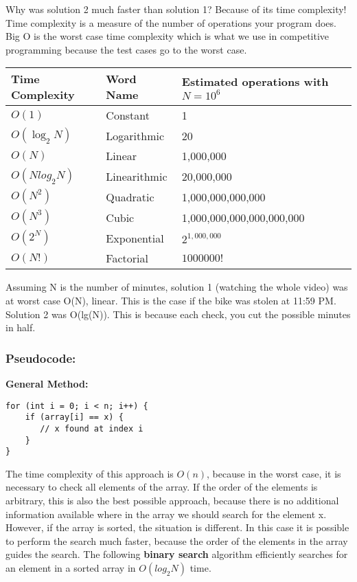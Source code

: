 \documentclass{report}
\begin{document}
Why was solution 2 much faster than solution 1? Because of its time complexity! Time complexity is a measure of the number of operations your program does. Big O is the worst case time complexity which is what we use in competitive programming because the test cases go to the worst case. 

\begin{table}[ht]
    \centering
    \begin{tabularx}{\linewidth}{|X|X|X|}
        \hline
        \cellcolor{gray!25} \textbf{Time Complexity} & \cellcolor{gray!25} \textbf{Word Name} & \cellcolor{gray!25} \textbf{Estimated operations with $N = 10^6$} \\
        \hline
        $O(1)$ & Constant & 1 \\
        \hline
        $O(\log_2N)$ & Logarithmic & 20 \\
        \hline
        $O(N)$ & Linear & 1,000,000 \\
        \hline
        $O(Nlog_2N)$ & Linearithmic & 20,000,000 \\
        \hline
        $O(N^2)$ & Quadratic & 1,000,000,000,000 \\
        \hline
        $O(N^3)$ & Cubic & 1,000,000,000,000,000,000 \\
        \hline
        $O(2^N)$ & Exponential & $2^{1,000,000}$ \\
        \hline
        $O(N!)$ & Factorial & $1000000!$ \\
        \hline
    \end{tabularx}
\end{table}

Assuming N is the number of minutes, solution 1 (watching the whole video) was at worst case O(N), linear. This is the case if the bike was stolen at 11:59 PM. Solution 2 was O(lg(N)). This is because each check, you cut the possible minutes in half.

\subsubsection*{Pseudocode:}
\textbf{General Method: }
\begin{lstlisting}[caption=Linear Search]
for (int i = 0; i < n; i++) {
    if (array[i] == x) {
       // x found at index i
    } 
}   
\end{lstlisting}
The time complexity of this approach is $O(n)$, because in the worst case, it is necessary to check all elements of the array. If the order of the elements is arbitrary, this is also the best possible approach, because there is no additional information available where in the array we should search for the element x. \newline
However, if the array is sorted, the situation is different. In this case it is possible to perform the search much faster, because the order of the elements in the array guides the search. The following \textbf{binary search} algorithm efficiently searches for an element in a sorted array in $O(log_2N)$ time.
\end{document}
